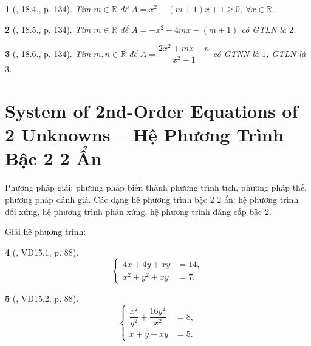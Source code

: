 \documentclass{article}
\newtheorem{baitoan}{}
\begin{document}
\begin{baitoan}[\cite{TLCT_THCS_Toan_9_dai_so}, 18.4., p. 134]
	Tìm $m\in\mathbb{R}$ để $A = x^2 - (m + 1)x + 1\ge0$, $\forall x\in\mathbb{R}$.
\end{baitoan}

\begin{baitoan}[\cite{TLCT_THCS_Toan_9_dai_so}, 18.5., p. 134]
	Tìm $m\in\mathbb{R}$ để $A = -x^2 + 4mx - (m + 1)$ có {\rm GTLN} là $2$.
\end{baitoan}

\begin{baitoan}[\cite{TLCT_THCS_Toan_9_dai_so}, 18.6., p. 134]
	Tìm $m,n\in\mathbb{R}$ để $A = \dfrac{2x^2 + mx + n}{x^2 + 1}$ có {\rm GTNN} là $1$, {\rm GTLN} là $3$.
\end{baitoan}


\section{System of 2nd-Order Equations of 2 Unknowns -- Hệ Phương Trình Bậc 2 2 Ẩn}
 Phương pháp giải: phương pháp biến thành phương trình tích, phương pháp thế, phương pháp đánh giá.  Các dạng hệ phương trình bậc 2 2 ẩn: hệ phương trình đối xứng, hệ phương trình phản xứng, hệ phương trình đẳng cấp bậc 2.

Giải hệ phương trình:

\begin{baitoan}[\cite{TLCT_THCS_Toan_9_dai_so}, VD15.1, p. 88]
	\begin{equation*}
		\left\{\begin{split}
			4x + 4y + xy &= 14,\\
			x^2 + y^2 + xy &= 7.
		\end{split}\right.
	\end{equation*}
\end{baitoan}

\begin{baitoan}[\cite{TLCT_THCS_Toan_9_dai_so}, VD15.2, p. 88]
	\begin{equation*}
		\left\{\begin{split}
			\dfrac{x^2}{y^2} + \dfrac{16y^2}{x^2} &= 8,\\
			x + y + xy &= 5.
		\end{split}\right.
	\end{equation*}
\end{baitoan}
\end{document}
